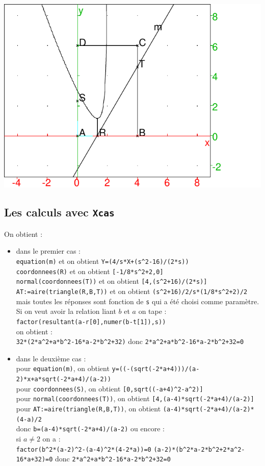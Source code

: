 \documentclass[a4paper,11pt]{book}
\begin{document}
\includegraphics[width=\textwidth]{minia}

\subsection{Les calculs avec {\tt Xcas}}
 On obtient :\\
\begin{itemize}
\item dans le premier cas :\\
{\tt equation(m)} et on obtient {\tt Y=(4/s*X+(s\verb|^|2-16)/(2*s))}\\
{\tt coordonnees(R)} et on obtient {\tt [-1/8*s\verb|^|2+2,0]}\\
{\tt normal(coordonnees(T))} et on obtient {\tt [4,(s\verb|^|2+16)/(2*s)]}\\
{\tt AT:=aire(triangle(R,B,T))} et on obtient {\tt (s\verb|^|2+16)/2/s*(1/8*s\verb|^|2+2)/2}\\
mais toutes les r\'eponses sont fonction de {\tt s} qui a \'et\'e choisi comme 
param\`etre.\\
Si on veut avoir la relation liant $b$ et $a$ on tape :\\
{\tt factor(resultant(a-r[0],numer(b-t[1]),s))} \\
on obtient :\\
{\tt 32*(2*a\verb|^|2+a*b\verb|^|2-16*a-2*b\verb|^|2+32)}
donc {\tt 2*a\verb|^|2+a*b\verb|^|2-16*a-2*b\verb|^|2+32=0}
\item dans le deuxi\`eme cas :\\
pour {\tt equation(m)}, on obtient {\tt y=((-(sqrt(-2*a+4)))/(a-2)*x+a*sqrt(-2*a+4)/(a-2))}\\
pour {\tt coordonnees(S)}, on obtient {\tt [0,sqrt((-a+4)\verb|^|2-a\verb|^|2)]}\\
pour {\tt normal(coordonnees(T))}, on obtient 
{\tt [4,(a-4)*sqrt(-2*a+4)/(a-2)]}\\
pour {\tt AT:=aire(triangle(R,B,T))}, on obtient 
{\tt (a-4)*sqrt(-2*a+4)/(a-2)*(4-a)/2}\\
donc {\tt b=(a-4)*sqrt(-2*a+4)/(a-2)} ou encore :\\
si $a\neq 2$ on a :\\
{\tt factor(b\verb|^|2*(a-2)\verb|^|2-(a-4)\verb|^|2*(4-2*a))=0} 
{\tt (a-2)*(b\verb|^|2*a-2*b\verb|^|2+2*a\verb|^|2-16*a+32)=0}
donc {\tt 2*a\verb|^|2+a*b\verb|^|2-16*a-2*b\verb|^|2+32=0}
\end{itemize}
\end{document}
